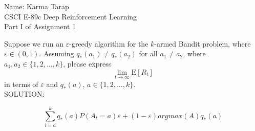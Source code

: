 \documentclass[12pt]{letter}
\newcommand{\E}{\mathrm{E}}
\begin{document}
\begin{flushleft}
{\sc Name: Karma Tarap \\
CSCI E-89c Deep Reinforcement Learning\\
Part I of Assignment 1\\}
\end{flushleft}

Suppose we run an $\varepsilon$-greedy algorithm for the $k$-armed Bandit problem, where $\varepsilon\in (0,1)$. Assuming $q_*(a_1)\neq q_*(a_2)$ for all $a_1\neq a_2$, where  $a_1,a_2\in \{1,2,\ldots,k\}$, please express
$$\lim_{t\to\infty} \E\left[R_t \right]$$
in terms of $\varepsilon$ and $q_*(a)$, $a\in \{1,2,\ldots,k\}$.\medskip\\
SOLUTION:

\[\sum_{i=a}^k q_*(a) P(A_t = a) \varepsilon + (1-\varepsilon) argmax(A)q_*(a)\]

 
\end{document}
